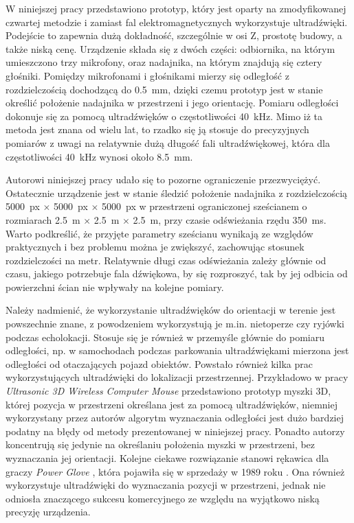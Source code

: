  W niniejszej pracy przedstawiono prototyp, który jest oparty na zmodyfikowanej czwartej metodzie i zamiast 
 fal elektromagnetycznych wykorzystuje ultradźwięki. 
 Podejście to zapewnia dużą dokładność, szczególnie w osi Z, prostotę budowy, a także niską cenę.
 Urządzenie składa się z dwóch części: odbiornika, na którym umieszczono trzy mikrofony, oraz nadajnika,
 na którym znajdują się cztery głośniki. Pomiędzy mikrofonami i głośnikami mierzy się odległość z rozdzielczością
 dochodzącą do \SI{0,5}{mm}, dzięki czemu prototyp jest w stanie określić położenie nadajnika
w przestrzeni i jego orientację. 
Pomiaru odległości dokonuje się za pomocą ultradźwięków o częstotliwości \SI{40}{kHz}.
Mimo iż ta metoda jest znana od wielu lat, to rzadko się ją stosuje do precyzyjnych pomiarów
z uwagi na relatywnie dużą długość fali ultradźwiękowej,
która dla częstotliwości \SI{40}{kHz} wynosi około \SI{8.5}{mm}.

Autorowi niniejszej pracy udało się to pozorne ograniczenie przezwyciężyć.
Ostatecznie urządzenie jest w stanie śledzić położenie nadajnika z rozdzielczością 
\SI{5000}{px} $\times$ \SI{5000}{px} $\times$ \SI{5000}{px} w przestrzeni ograniczonej sześcianem o rozmiarach 
\SI{2,5}{m} $\times$ \SI{2,5}{m}  $\times$ \SI{2,5}{m}, przy czasie odświeżania rzędu \SI{350}{ms}.
Warto podkreślić, że przyjęte parametry sześcianu wynikają ze względów praktycznych i bez 
problemu można je zwiększyć, zachowując stosunek rozdzielczości na metr.
Relatywnie długi czas odświeżania zależy głównie od czasu,  
 jakiego potrzebuje fala dźwiękowa, by się rozproszyć,
 tak by jej odbicia od powierzchni ścian nie wpływały na kolejne pomiary.

Należy nadmienić, że wykorzystanie ultradźwięków do orientacji w terenie jest powszechnie znane,
z powodzeniem wykorzystują je m.in. nietoperze czy ryjówki podczas echolokacji. Stosuje się je również 
w przemyśle głównie do pomiaru odległości, np. w samochodach podczas parkowania ultradźwiękami
mierzona jest odległości od otaczających pojazd obiektów. Powstało również kilka prac wykorzystujących ultradźwięki
do lokalizacji przestrzennej. 
Przykładowo w pracy \textit{Ultrasonic 3D Wireless Computer Mouse} \cite{bib:mouse} przedstawiono prototyp myszki 3D, której
pozycja w przestrzeni określana jest za pomocą ultradźwięków, niemniej wykorzystany przez autorów algorytm wyznaczania 
odległości jest dużo bardziej podatny na błędy od metody prezentowanej w niniejszej pracy. Ponadto autorzy koncentrują się jedynie
na określaniu położenia myszki w przestrzeni, bez wyznaczania jej orientacji.
Kolejne ciekawe rozwiązanie stanowi rękawica dla graczy 
\textit{Power Glove} \cite{bib:powerGlove}, która pojawiła się w sprzedaży w 1989 roku \cite{bib:powerGlove2}. 
Ona również wykorzystuje ultradźwięki do wyznaczania pozycji
w przestrzeni, jednak nie odniosła  znaczącego sukcesu komercyjnego ze względu na wyjątkowo niską precyzję urządzenia.

